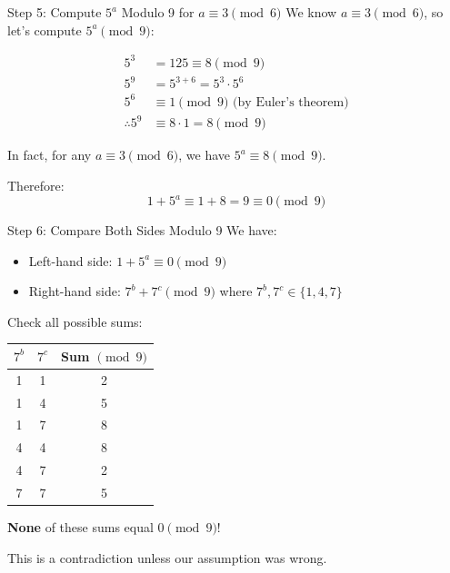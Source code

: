 \begin{frame}{Step 5: Compute $5^a$ Modulo 9 for $a \equiv 3 \pmod 6$}
    We know $a \equiv 3 \pmod 6$, so let's compute $5^a \pmod 9$:

    \begin{align*}
        5^3 &= 125 \equiv 8 \pmod 9 \\
        5^9 &= 5^{3+6} = 5^3 \cdot 5^6 \\
        5^6 &\equiv 1 \pmod 9 \text{ (by Euler's theorem)} \\
        \therefore 5^9 &\equiv 8 \cdot 1 = 8 \pmod 9
    \end{align*}

    In fact, for any $a \equiv 3 \pmod 6$, we have $5^a \equiv 8 \pmod 9$.

    Therefore:
    \[1 + 5^a \equiv 1 + 8 = 9 \equiv 0 \pmod 9\]
\end{frame}

\begin{frame}{Step 6: Compare Both Sides Modulo 9}
    We have:
    \begin{itemize}
        \item Left-hand side: $1 + 5^a \equiv 0 \pmod 9$
        \item Right-hand side: $7^b + 7^c \pmod 9$ where $7^b, 7^c \in \{1,4,7\}$
    \end{itemize}

    Check all possible sums:
    \begin{center}
    \begin{tabular}{c|c|c}
        $7^b$ & $7^c$ & Sum $\pmod 9$ \\ \hline
        1 & 1 & 2 \\
        1 & 4 & 5 \\
        1 & 7 & 8 \\
        4 & 4 & 8 \\
        4 & 7 & 2 \\
        7 & 7 & 5
    \end{tabular}
    \end{center}

    \textbf{None} of these sums equal $0 \pmod 9$!

    This is a contradiction unless our assumption was wrong.
\end{frame}

